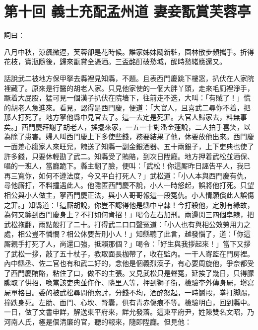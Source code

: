 
\chapter*{第十回 義士充配孟州道 妻妾翫賞芙蓉亭}


詞曰：

\begin{myquote}
八月中秋，涼飆微逗，芙蓉卻是花時候。誰家姊妹鬬新粧，園林散步頻攜手。折得花枝，寶瓶隨後，歸來翫賞全憑酒。三盃酩酊破愁城，醒時愁緒應還又。

\end{myquote}

話說武二被地方保甲拏去縣裡見知縣，不題。且表西門慶跳下樓窓，扒伏在人家院裡藏了。原來是行醫的胡老人家。只見他家使的一個大胖丫頭，走來毛廁裡淨手，蹶着大屁股，猛可見一個漢子扒伏在院墻下，往前走不迭，大叫：「有賊了！」{}慌的胡老人急進來。看見，認得是西門慶，便道：「大官人，且喜武二尋你不着，把那人打死了。地方拏他縣中見官去了。這一去定是死罪。大官人歸家去，料無事矣。」西門慶拜謝了胡老人，搖擺來家，一五一十對潘金蓮說，二人拍手喜笑，以為除了患害。{}婦人叫西門慶上下多使些錢，務要結果了他，休要放他出來。西門慶一面差心腹家人來旺兒，餽送了知縣一副金銀酒器、五十兩銀子，上下吏典也使了許多錢，只要休輕勘了武二。知縣受了賄賂，到次日陞廳。地方押着武松並酒保、唱的一班人，當廳跪下。縣主翻了臉，便叫：「武松！你這厮昨日誣告平人，我已再三寬你，如何不遵法度，今又平白打死人？」武松道：「小人本與西門慶有仇，尋他厮打，不料撞遇此人。他隱匿西門慶不說，小人一時怒起，誤將他打死。只望相公與小人做主，拏西門慶正法，與小人哥哥報這一段冤仇。小人情願償此人誤傷之罪。」知縣道：「這厮胡說，你豈不認得他是縣中皁隸！今打殺他，定別有緣故，為何又纏到西門慶身上？不打如何肯招！」喝令左右加刑。兩邊閃三四個皁隸，把武松拖翻，雨點般打了二十。打得武二口口聲冤道：「小人也有與相公效勞用力之處，相公豈不憐憫？相公休要苦刑小人！」知縣聽了此言，越發惱了，道：「你這厮親手打死了人，尚還口強，抵賴那個？」喝令：「好生與我拶起來！」當下又拶了武松一拶，敲了五十杖子，教取面長枷帶了，收在監內。一干人寄監在門房裡。內中縣丞、佐二官也有和武二好的，念他是個義烈漢子，有心要周旋他，爭奈都受了西門慶賄賂，粘住了口，做不的主張。又見武松只是聲冤，延挨了幾日，只得朦朧取了供招，喚當該吏典並仵作、隣里人等，押到獅子街，檢驗李外傳身屍，塡寫屍單格目。委的被武松尋問他索討，分錢不均，酒醉怒起，一時鬬毆，拳打脚踢，撞跌身死。左肋、面門、心坎、腎囊，俱有青赤傷痕不等。檢驗明白，回到縣中。一日，做了文書申詳，解送東平府來，詳允發落。這東平府尹，姓陳雙名文昭，乃河南人氏，極是個清廉的官，聽的報來，隨即陞廳。但見他：

